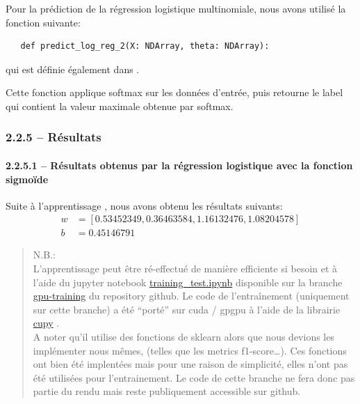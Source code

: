\documentclass[
]{article}
\begin{document}
Pour la prédiction de la régression logistique multinomiale, nous avons
utilisé la fonction suivante:

\begin{lstlisting}
   def predict_log_reg_2(X: NDArray, theta: NDArray):
\end{lstlisting}

qui est définie également dans .

Cette fonction applique softmax sur les données d'entrée, puis retourne
le label qui contient la valeur maximale obtenue par softmax.

\newpage{}

\hypertarget{ruxe9sultats}{%
\subsubsection{2.2.5 -- Résultats}\label{ruxe9sultats}}

\hypertarget{ruxe9sultats-obtenus-par-la-ruxe9gression-logistique-avec-la-fonction-sigmouxefde}{%
\paragraph{2.2.5.1 -- Résultats obtenus par la régression logistique
avec la fonction
sigmoïde}\label{ruxe9sultats-obtenus-par-la-ruxe9gression-logistique-avec-la-fonction-sigmouxefde}}

Suite à l'apprentissage , nous avons obtenu les résultats suivants:
\begin{align*}
    w &= [0.53452349, 0.36463584, 1.16132476, 1.08204578]\\
    b &= 0.45146791
\end{align*}

\begin{quote}
N.B.:\\
L'apprentissage peut être ré-effectué de manière efficiente si besoin et
à l'aide du jupyter notebook
\href{https://github.com/David-Kyrat/13X005-AI-Project/blob/gpu-training/training_test.ipynb}{training\_test.ipynb}
disponible sur la branche
\href{https://github.com/David-Kyrat/13X005-AI-Project/blob/gpu-training/training_test.ipynb}{gpu-training}
du repository github. Le code de l'entraînement (uniquement sur cette
branche) a été ``porté'' sur cuda / gpgpu à l'aide de la librairie
\href{https://cupy.dev}{cupy} \cite{NumPySciPyGPU}.\\
A noter qu'il utilise des fonctions de sklearn alors que nous devions
les implémenter nous mêmes, (telles que les metrics f1-score\ldots). Ces
fonctions ont bien été implentées mais pour une raison de simplicité,
elles n'ont pas été utilisées pour l'entrainement. Le code de cette
branche ne fera donc pas partie du rendu mais reste publiquement
accessible sur github.
\end{quote}
\end{document}
